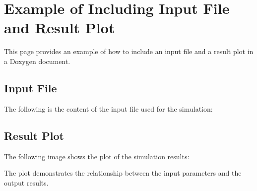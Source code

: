\section*{Example of Including Input File and Result Plot}

This page provides an example of how to include an input file and a result plot in a Doxygen document.

\subsection*{Input File}

The following is the content of the input file used for the simulation\-:


\begin{DoxyCodeInclude}
\end{DoxyCodeInclude}
 
\begin{DoxyCodeInclude}
\end{DoxyCodeInclude}
 
\begin{DoxyCodeInclude}
\end{DoxyCodeInclude}


\subsection*{Result Plot}

The following image shows the plot of the simulation results\-:

 

The plot demonstrates the relationship between the input parameters and the output results. 